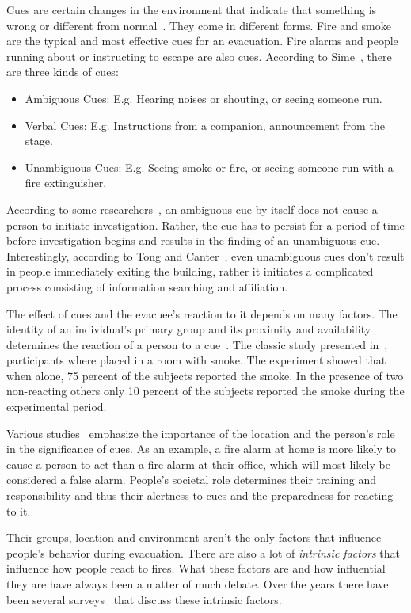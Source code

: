 Cues are certain changes in the environment that indicate that something is wrong or different from normal~\cite{Sime:1983uy}.
They come in different forms. Fire and smoke are the typical and most effective cues for an evacuation. Fire alarms and people running about or instructing to escape are also cues. According to Sime~\cite{Sime:1983uy}, there are three kinds of cues:
\begin{itemize}
\item Ambiguous Cues: E.g. Hearing noises or shouting, or seeing someone run.
\item Verbal Cues: E.g. Instructions from a companion, announcement from the stage.
\item Unambiguous Cues: E.g. Seeing smoke or fire, or seeing someone run with a fire extinguisher.
\end{itemize}


According to some researchers~\cite{Ramachandran:1990wj,Proulx:2007ul}, an ambiguous cue by itself does not cause a person to initiate investigation. Rather, the cue has to persist for a period of time before investigation begins and results in the finding of an unambiguous cue. Interestingly, according to Tong and Canter~\cite{Tong:1985wn}, even unambiguous cues don't result in people immediately exiting the building, rather it initiates a complicated process consisting of information searching and affiliation.

The effect of cues and the evacuee's reaction to it depends on many factors. The identity of an individual's primary group and its proximity and availability determines the reaction of a person to a cue~\cite{Sime:1983uy}. The classic study presented in~\cite{Latane:1969wm}, participants where placed in a room with smoke. The experiment showed that when alone, 75 percent of the subjects reported the smoke. In the presence of two non-reacting others only 10 percent of the subjects reported the smoke during the experimental period.

Various studies~\cite{Proulx:2003tc,Proulx:2001we,Paulsen:1984ti,Sandberg:1997tw,Cocking:2008vv,Tong:1985wn} emphasize the importance of the location and the person's role in the significance of cues. As an example, a fire alarm at home is more likely to cause a person to act than a fire alarm at their office, which will most likely be considered a false alarm. People's societal role determines their training and responsibility and thus their alertness to cues and the preparedness for reacting to it.

Their groups, location and environment aren't the only factors that influence people's behavior during evacuation. There are also a lot of \emph{intrinsic factors} that influence how people react to fires. What these factors are and how influential they are have always been a matter of much debate. Over the years there have been several surveys~\cite{Tong:1985wn,Sandberg:1997tw,Kuligowski:2009un} that discuss these intrinsic factors.

